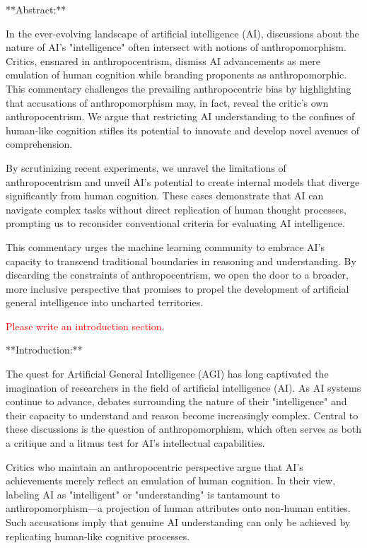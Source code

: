 \documentclass{article}
\begin{document}
**Abstract:**

In the ever-evolving landscape of artificial intelligence (AI), discussions about the nature of AI's "intelligence" often intersect with notions of anthropomorphism. Critics, ensnared in anthropocentrism, dismiss AI advancements as mere emulation of human cognition while branding proponents as anthropomorphic. This commentary challenges the prevailing anthropocentric bias by highlighting that accusations of anthropomorphism may, in fact, reveal the critic's own anthropocentrism. We argue that restricting AI understanding to the confines of human-like cognition stifles its potential to innovate and develop novel avenues of comprehension.

By scrutinizing recent experiments, we unravel the limitations of anthropocentrism and unveil AI's potential to create internal models that diverge significantly from human cognition. These cases demonstrate that AI can navigate complex tasks without direct replication of human thought processes, prompting us to reconsider conventional criteria for evaluating AI intelligence.

This commentary urges the machine learning community to embrace AI's capacity to transcend traditional boundaries in reasoning and understanding. By discarding the constraints of anthropocentrism, we open the door to a broader, more inclusive perspective that promises to propel the development of artificial general intelligence into uncharted territories.

\textcolor{red}{Please write an introduction section.}

**Introduction:**

The quest for Artificial General Intelligence (AGI) has long captivated the imagination of researchers in the field of artificial intelligence (AI). As AI systems continue to advance, debates surrounding the nature of their "intelligence" and their capacity to understand and reason become increasingly complex. Central to these discussions is the question of anthropomorphism, which often serves as both a critique and a litmus test for AI's intellectual capabilities.

Critics who maintain an anthropocentric perspective argue that AI's achievements merely reflect an emulation of human cognition. In their view, labeling AI as "intelligent" or "understanding" is tantamount to anthropomorphism—a projection of human attributes onto non-human entities. Such accusations imply that genuine AI understanding can only be achieved by replicating human-like cognitive processes.
\end{document}
